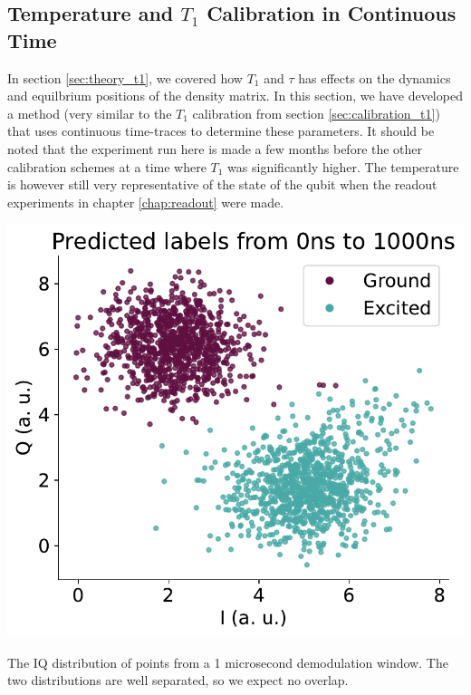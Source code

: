 \subsection{Temperature and $T_1$ Calibration in Continuous Time}\label{sec:continuous_calibratino}
In section \ref{sec:theory_t1}, we covered how $T_1$ and $\tau$ has effects on the dynamics and equilbrium positions of the density matrix. In this section, we have developed a method (very similar to the $T_1$ calibration from section \ref{sec:calibration_t1}) that uses continuous time-traces to determine these parameters. It should be noted that the experiment run here is made a few months before the other calibration schemes at a time where $T_1$ was significantly higher. The temperature is however still very representative of the state of the qubit when the readout experiments in chapter \ref{chap:readout} were made.


\begin{marginfigure}
    \centering
    \includegraphics{projects/in_measurement_calibration/Distributions_long_pulse.pdf}
    \caption{The IQ distribution of points from a 1 microsecond demodulation window. The two distributions are well separated, so we expect no overlap.}
    \label{fig:IQ_distribution}
\end{marginfigure}


